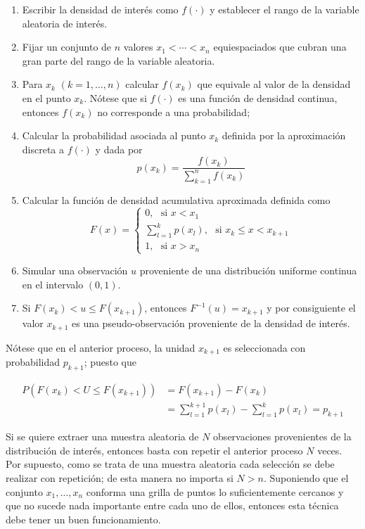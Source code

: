 \documentclass[
  10pt,
  spanish,
]{book}
\providecommand{\tightlist}{%
  \setlength{\itemsep}{0pt}\setlength{\parskip}{0pt}}
\theoremstyle{definition}
\theoremstyle{definition}
\theoremstyle{definition}
\theoremstyle{definition}
\theoremstyle{remark}
\begin{document}
\begin{enumerate}
\def\labelenumi{\arabic{enumi}.}
\tightlist
\item
  Escribir la densidad de interés como \(f(\cdot)\) y establecer el rango de la variable aleatoria de interés.
\item
  Fijar un conjunto de \(n\) valores \(x_1<\cdots<x_n\) equiespaciados que cubran una gran parte del rango de la variable aleatoria.
\item
  Para \(x_k\) \((k=1,\ldots,n)\) calcular \(f(x_k)\) que equivale al valor de la densidad en el punto \(x_k\). Nótese que si \(f(\cdot)\) es una función de densidad continua, entonces \(f(x_k)\) no corresponde a una probabilidad;
\item
  Calcular la probabilidad asociada al punto \(x_k\) definida por la aproximación discreta a \(f(\cdot)\) y dada por
  \begin{equation*}
  p(x_k)=\frac{f(x_k)}{\sum_{k=1}^{n}f(x_k)}
  \end{equation*}
\item
  Calcular la función de densidad acumulativa aproximada definida como
  \begin{equation*}
  F(x)=
  \begin{cases}
  0, \ \ \ \text{si $x<x_1$}\\
  \sum_{l=1}^kp(x_l), \ \ \ \text{si $x_k\leq x<x_{k+1}$}\\
  1, \ \ \ \text{si $x>x_n$}
  \end{cases}
  \end{equation*}
\item
  Simular una observación \(u\) proveniente de una distribución uniforme continua en el intervalo \((0,1)\).
\item
  Si \(F(x_k)<u\leq F(x_{k+1})\), entonces \(F^{-1}(u)=x_{k+1}\) y por consiguiente el valor \(x_{k+1}\) es una pseudo-observación proveniente de la densidad de interés.
\end{enumerate}

Nótese que en el anterior proceso, la unidad \(x_{k+1}\) es seleccionada con probabilidad \(p_{k+1}\); puesto que

\begin{align*}
P(F(x_k)< U \leq F(x_{k+1}))&=F(x_{k+1})-F(x_{k})\\
&=\sum_{l=1}^{k+1}p(x_l)-\sum_{l=1}^kp(x_l)=p_{k+1}
\end{align*}

Si se quiere extraer una muestra aleatoria de \(N\) observaciones provenientes de la distribución de interés, entonces basta con repetir el anterior proceso \(N\) veces. Por supuesto, como se trata de una muestra aleatoria cada selección se debe realizar con repetición; de esta manera no importa si \(N>n\). Suponiendo que el conjunto \(x_1,\ldots,x_n\) conforma una grilla de puntos lo suficientemente cercanos y que no sucede nada importante entre cada uno de ellos, entonces esta técnica debe tener un buen funcionamiento.
\end{document}

